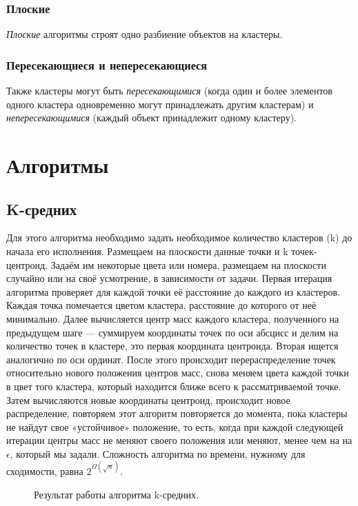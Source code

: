 \documentclass[12pt, a4paper]{article}
\begin{document}
\subsubsection{Плоские}\textit{Плоские} алгоритмы строят одно разбиение объектов на кластеры.
\subsubsection{Пересекающиеся и непересекающиеся}Также кластеры могут быть \textit{пересекающимися} (когда один и более элементов одного кластера одновременно могут принадлежать другим кластерам) и \textit{непересекающимися} (каждый объект принадлежит одному кластеру).
\section{Алгоритмы}
\subsection{K-средних}Для этого алгоритма необходимо задать необходимое количество кластеров (k) до начала его исполнения. Размещаем на плоскости данные точки и k точек-центроид. Задаём им некоторые цвета или номера, размещаем на плоскости случайно или на своё усмотрение, в зависимости от задачи. Первая итерация алгоритма проверяет для каждой точки её расстояние до каждого из кластеров. Каждая точка помечается цветом кластера, расстояние до которого от неё минимально. Далее вычисляется центр масс каждого кластера, полученного на предыдущем шаге --- суммируем координаты точек по оси абсцисс и делим на количество точек в кластере, это первая координата центроида. Вторая ищется аналогично по оси ординат. После этого происходит перераспределение точек относительно нового положения центров масс, снова меняем цвета каждой точки в цвет того кластера, который находится ближе всего к рассматриваемой точке. Затем вычисляются новые координаты центроид, происходит новое распределение, повторяем этот алгоритм повторяется до момента, пока кластеры не найдут свое «устойчивое» положение, то есть, когда при каждой следующей итерации центры масс не меняют своего положения или меняют, менее чем на на $\epsilon$, который мы задали. Сложность алгоритма по времени, нужному для сходимости, равна $2^{\Omega(\sqrt{n})}.$
\begin{figure}[h!]
\caption{Результат работы алгоритма k-средних.}
\label{fig:k}
\end{figure}
\end{document}
